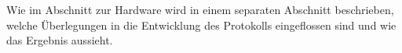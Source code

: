 Wie im Abschnitt  zur Hardware wird in einem  separaten Abschnitt beschrieben,
welche \"Uberlegungen in die Entwicklung  des Protokolls eingeflossen sind und
wie das Ergebnis aussieht.


{\begin{a3pages}
    \lipsum
    \lipsum
    \lipsum
    \lipsum
    \lipsum
    \begin{minipage}{.5\textwidth}
        \lipsum
    \end{minipage}
    \begin{minipage}{.5\textwidth}
            \centering
        \label{fig:test}
    \end{minipage}
\end{a3pages}}
%
\lipsum
